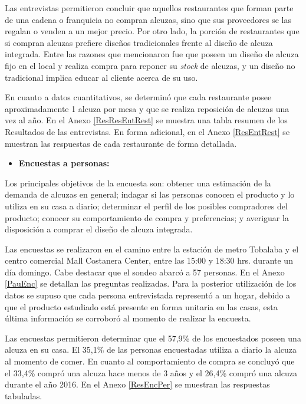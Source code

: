 Las entrevistas permitieron concluir que aquellos restaurantes que forman parte de una cadena o franquicia no compran alcuzas, sino que sus proveedores se las regalan o venden a un mejor precio. Por otro lado, la porción de restaurantes que si compran alcuzas prefiere diseños tradicionales  frente al diseño de alcuza integrada. Entre las razones que mencionaron fue que poseen un diseño de alcuza fijo en el local y realiza compra para reponer su \textit{stock} de alcuzas, y un diseño no tradicional implica educar al cliente acerca de su uso.

En cuanto a datos cuantitativos, se determinó que cada restaurante posee aproximadamente 1 alcuza por mesa y que se realiza reposición de alcuzas una vez al año. En el Anexo \ref{ResResEntRest} se muestra una tabla resumen de los Resultados de las entrevistas. En forma adicional, en el Anexo \ref{ResEntRest} se muestran las respuestas de cada restaurante de forma detallada.

\begin{itemize}
\item \textbf{Encuestas a personas:}
\end{itemize}

Los principales objetivos de la encuesta son: obtener una estimación de la demanda de alcuzas en general; indagar si las personas conocen el producto y lo utiliza en su casa a diario; determinar el perfil de los posibles compradores del producto; conocer su comportamiento de compra y preferencias; y averiguar la disposición a comprar el diseño de alcuza integrada.

Las encuestas se realizaron en el camino entre la estación de metro Tobalaba y el centro comercial Mall Costanera Center, entre las 15:00 y 18:30 hrs. durante un día domingo. Cabe destacar que el sondeo abarcó a 57 personas.  En el  Anexo \ref{PauEnc} se detallan las preguntas realizadas. Para la posterior utilización de los datos se supuso que cada persona entrevistada representó a un hogar, debido a que el producto estudiado está presente en forma unitaria en las casas, esta última información se corroboró al momento de realizar la encuesta.

Las encuestas permitieron determinar que el 57,9\% de los encuestados poseen una alcuza en su casa. El 35,1\% de las personas encuestadas utiliza a diario la alcuza al momento de comer. En cuanto al comportamiento de compra se concluyó que el 33,4\% compró una alcuza hace menos de 3 años y el 26,4\% compró una alcuza durante el año 2016. En el Anexo \ref{ResEncPer}  se muestran las respuestas tabuladas.


